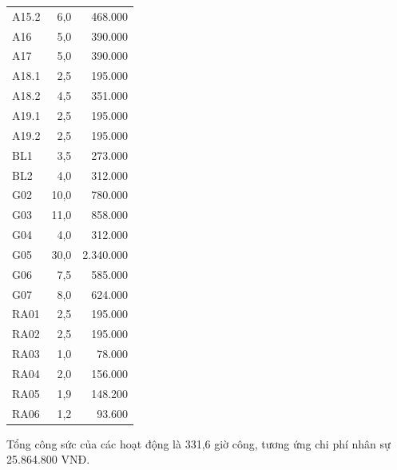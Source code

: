 \begin{table}[H]
\begin{minipage}[t]{.46\linewidth}
\begin{tabular*}{\linewidth}{@{\extracolsep{\fill}}lrr@{}}
\midrule
A15.2 & 6,0 & 468.000 \\
A16 & 5,0 & 390.000 \\
A17 & 5,0 & 390.000 \\
A18.1 & 2,5 & 195.000 \\
A18.2 & 4,5 & 351.000 \\
A19.1 & 2,5 & 195.000 \\
A19.2 & 2,5 & 195.000 \\
BL1 & 3,5 & 273.000 \\
BL2 & 4,0 & 312.000 \\
G02 & 10,0 & 780.000 \\
G03 & 11,0 & 858.000 \\
G04 & 4,0 & 312.000 \\
G05 & 30,0 & 2.340.000 \\
G06 & 7,5 & 585.000 \\
G07 & 8,0 & 624.000 \\
RA01 & 2,5 & 195.000 \\
RA02 & 2,5 & 195.000 \\
RA03 & 1,0 & 78.000 \\
RA04 & 2,0 & 156.000 \\
RA05 & 1,9 & 148.200 \\
RA06 & 1,2 & 93.600 \\
\bottomrule
\end{tabular*}
\end{minipage}
\endgroup
\end{table}

Tổng công sức của các hoạt động là 331,6 giờ công, tương ứng chi phí nhân sự 25.864.800 VNĐ.

